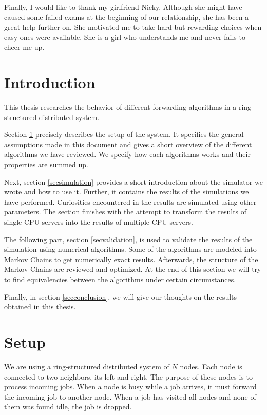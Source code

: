 \documentclass[10pt,a4paper]{article}
\begin{document}
Finally, I would like to thank my girlfriend Nicky. Although she might have caused some failed exams at the beginning of our relationship, she has been a great help further on. She motivated me to take hard but rewarding choices when easy ones were available. She is a girl who understands me and never fails to cheer me up.

\newpage

\tableofcontents

\newpage

\section*{Introduction}
This thesis researches the behavior of different forwarding algorithms in a ring-structured distributed system.

Section \ref{secsetup} precisely describes the setup of the system. It specifies the general assumptions made in this document and gives a short overview of the different algorithms we have reviewed. We specify how each algorithms works and their properties are summed up.

Next, section \ref{secsimulation} provides a short introduction about the simulator we wrote and how to use it. Further, it contains the results of the simulations we have performed. Curiosities encountered in the results are simulated using other parameters. The section finishes with the attempt to transform the results of single CPU servers into the results of multiple CPU servers.

The following part, section \ref{secvalidation}, is used to validate the results of the simulation using numerical algorithms. Some of the algorithms are modeled into Markov Chains to get numerically exact results. Afterwards, the structure of the Markov Chains are reviewed and optimized. At the end of this section we will try to find equivalencies between the algorithms under certain circumstances.

Finally, in section \ref{secconclusion}, we will give our thoughts on the results obtained in this thesis.

\section{Setup}
\label{secsetup}
We are using a ring-structured distributed system of $N$ nodes. Each node is connected to two neighbors, its left and right. The purpose of these nodes is to process incoming jobs. When a node is busy while a job arrives, it must forward the incoming job to another node. When a job has visited all nodes and none of them was found idle, the job is dropped.
\end{document}
